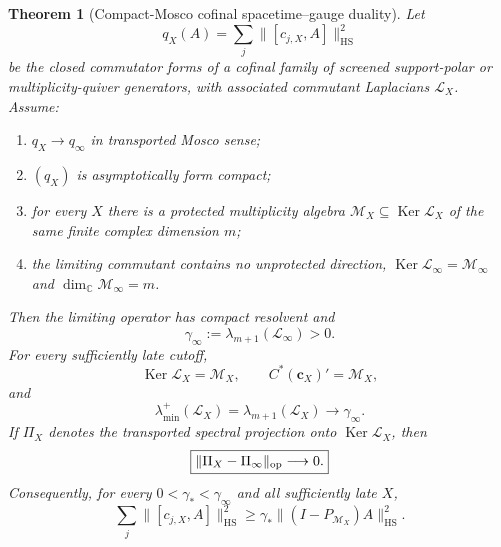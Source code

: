 \documentclass[11pt]{article}
\newtheorem{theorem}{Theorem}[section]
\theoremstyle{definition}
\theoremstyle{remark}
\newcommand{\C}{\mathbb C}
\newcommand{\Ker}{\operatorname{Ker}}
\newcommand{\HS}{\mathrm{HS}}
\newcommand{\norm}[1]{\lVert#1\rVert}
\newcommand{\M}{\mathcal M}
\begin{document}
\begin{theorem}[Compact-Mosco cofinal spacetime--gauge duality]
\label{thm:cofinal-duality}
Let
\begin{equation}
q_X(A)=\sum_j\norm{[c_{j,X},A]}_{\HS}^2
\label{eq:cofinal-form}
\end{equation}
be the closed commutator forms of a cofinal family of screened support-polar
or multiplicity-quiver generators, with associated commutant Laplacians
$\mathscr L_X$.  Assume:
\begin{enumerate}[label=\textup{(H\arabic*)},leftmargin=3em]
\item $q_X\to q_\infty$ in transported Mosco sense;
\item $(q_X)$ is asymptotically form compact;
\item for every $X$ there is a protected multiplicity algebra
      $\M_X\subseteq\Ker\mathscr L_X$ of the same finite complex dimension $m$;
\item the limiting commutant contains no unprotected direction,
      $\Ker\mathscr L_\infty=\M_\infty$ and
      $\dim_\C\M_\infty=m$.
\end{enumerate}
Then the limiting operator has compact resolvent and
\begin{equation}
\gamma_\infty
:=\lambda_{m+1}(\mathscr L_\infty)>0.
\label{eq:limit-gap}
\end{equation}
For every sufficiently late cutoff,
\begin{equation}
\boxed{
\Ker\mathscr L_X=\M_X,
\qquad
C^*(\bm c_X)'=\M_X,}
\label{eq:cofinal-kernel}
\end{equation}
and
\begin{equation}
\boxed{
\lambda_{\min}^+(\mathscr L_X)
=\lambda_{m+1}(\mathscr L_X)
\longrightarrow\gamma_\infty.}
\label{eq:cofinal-gap}
\end{equation}
If $\Pi_X$ denotes the transported spectral projection onto
$\Ker\mathscr L_X$, then
\begin{equation}
\boxed{\norm{\Pi_X-\Pi_\infty}_{\rm op}\longrightarrow0.}
\label{eq:kernel-projection-convergence}
\end{equation}
Consequently, for every $0<\gamma_*<\gamma_\infty$ and all sufficiently late
$X$,
\begin{equation}
\boxed{
\sum_j\norm{[c_{j,X},A]}_{\HS}^2
\ge
\gamma_*\norm{(I-P_{\M_X})A}_{\HS}^2.}
\label{eq:cofinal-coercivity}
\end{equation}
\end{theorem}
\end{document}
